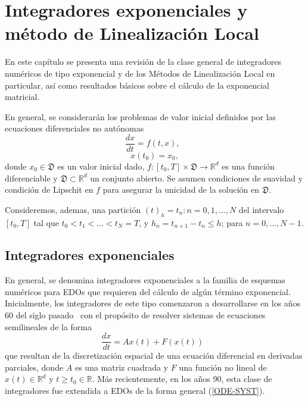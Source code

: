\chapter{Integradores exponenciales y método de Linealización Local}\label{chapter:exp-int-and-ll-methods}

En este capítulo se presenta una revisión de la clase general de  integradores numéricos de tipo exponencial y de los Métodos de Linealización Local en particular, así como resultados básicos sobre el cálculo de la exponencial matricial.

En general, se considerarán los problemas de valor inicial definidos por las ecuaciones diferenciales no autónomas
 \begin{equation}
 \frac{dx}{dt}=f(t,x), \;\; \label{ODE-SYST}
 \end{equation}
 \begin{equation*}
 x(t_0)=x_0,
 \end{equation*}
 donde $x_0\in \mathfrak{D}$ es un valor inicial dado, $f: [t_0,T] \times \mathfrak{D}\longrightarrow \mathbb{R}^{d}$ es una función diferenciable y $\mathfrak{D}\subset\mathbb{R}^{d}$ un conjunto abierto. Se asumen condiciones de suavidad y condición de Lipschit en $f$ para asegurar la unicidad de la solución en $\mathfrak{D}$.

Consideremos, ademas, una partición $(t)_{h}={t_{n}:n=0,1,\ldots,N}$ del
intervalo $[t_{0},T]$ tal que $t_{0}<t_{1}<\ldots<t_{N}=T$, y $%
h_{n}=t_{n+1}-t_{n}\leq h$; para $n=0,\ldots,N-1$.

\section{Integradores exponenciales}

En general, se denomina integradores exponenciales a la familia
de esquemas numéricos para EDOs que requieren del cálculo de algún término exponencial. Inicialmente, los integradores de este tipo comenzaron a desarrollarse en los años 60 del siglo pasado~\cite{Berland07} con el propósito de resolver sistemas de ecuaciones semilineales de la forma
\begin{equation}
\frac{dx}{dt} = Ax(t) + F(x(t))  \;\;  \label{ODE Lines Method}
\end{equation}
que resultan de la discretización espacial de una ecuación diferencial en derivadas parciales, donde $A$ es una
matriz cuadrada y $F$ una función no lineal de $x(t)\in\mathbb{R}^d$ y $t\geq t_0 \in \mathbb{R}$. Más recientemente, en los años 90, esta clase de integradores fue extendida a EDOs de la forma general (\ref{ODE-SYST}).

